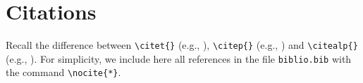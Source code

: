 \section{Citations}

Recall the difference between \verb+\citet{}+ (e.g., \citet{Chu:Geor:99}), \verb+\citep{}+ (e.g., \citep{Chu:Geor:99}) and \verb+\citealp{}+ (e.g., \citealp{Chu:Geor:99}).
For simplicity, we include here all references in the file \verb+biblio.bib+ with the command \verb+\nocite{*}+.\nocite{*}

